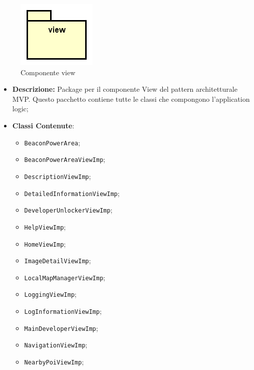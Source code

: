 \documentclass[../DefinizioneDiProdotto.tex]{subfiles}
\begin{document}
\begin{figure}[H]
	\centering
	\includegraphics[width=\maxwidth]{img/package/view.png}
	\caption{Componente view}\label{fig:view} 
\end{figure}
\begin{itemize}
	\item \textbf{Descrizione:} Package per il componente View del pattern architetturale MVP. Questo pacchetto contiene tutte le classi che compongono l'application logic;
	\item \textbf{Classi Contenute}:
	\begin{itemize}
		\item \texttt{BeaconPowerArea};
		
		\item \texttt{BeaconPowerAreaViewImp};
		
		\item \texttt{DescriptionViewImp};
		
		\item \texttt{DetailedInformationViewImp};
		
		\item \texttt{DeveloperUnlockerViewImp};
		
		\item \texttt{HelpViewImp};
		
		\item \texttt{HomeViewImp};
		
		\item \texttt{ImageDetailViewImp};
		
		\item \texttt{LocalMapManagerViewImp};
		
		\item \texttt{LoggingViewImp};
		
		\item \texttt{LogInformationViewImp};
		
		\item \texttt{MainDeveloperViewImp};
		
		\item \texttt{NavigationViewImp};
		
		\item \texttt{NearbyPoiViewImp};
		

\end{itemize}
\end{itemize}
\end{document}
